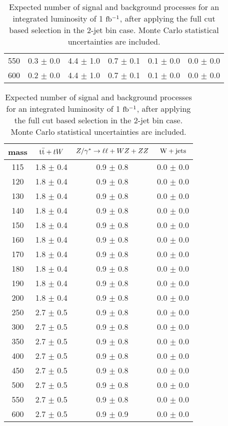 \begin{table}[!ht]
\begin{center}
{\begin{tabular} {|c|c|c|c|c|c|}
550 & 0.3 $\pm$        0.0 &  4.4    $\pm$    1.0 &  0.7 $\pm$   0.1 & 0.1 $\pm$   0.0 &  0.0 $\pm$   0.0 \\
600 & 0.2 $\pm$        0.0 &  4.4    $\pm$    1.0 &  0.7 $\pm$   0.1 & 0.1 $\pm$   0.0 &  0.0 $\pm$   0.0 \\
 \hline
  \end{tabular}
  }
 {\normalsize
  \begin{tabular} {|c|c|c|c|}
\hline
  mass    & $\mathrm{t}\bar{\mathrm{t}}+tW$ & $Z/\gamma^*\to\ell\ell+WZ+ZZ$ & $\mathrm{W+jets}$ \\
  \hline
  \hline
115 &   1.8 $\pm$   0.4 &   0.9 $\pm$   0.8 &  0.0 $\pm$   0.0 \\
120 &   1.8 $\pm$   0.4 &   0.9 $\pm$   0.8 &  0.0 $\pm$   0.0 \\
130 &   1.8 $\pm$   0.4 &   0.9 $\pm$   0.8 &  0.0 $\pm$   0.0 \\
140 &   1.8 $\pm$   0.4 &   0.9 $\pm$   0.8 &  0.0 $\pm$   0.0 \\
150 &   1.8 $\pm$   0.4 &   0.9 $\pm$   0.8 &  0.0 $\pm$   0.0 \\
160 &   1.8 $\pm$   0.4 &   0.9 $\pm$   0.8 &  0.0 $\pm$   0.0 \\
170 &   1.8 $\pm$   0.4 &   0.9 $\pm$   0.8 &  0.0 $\pm$   0.0 \\
180 &   1.8 $\pm$   0.4 &   0.9 $\pm$   0.8 &  0.0 $\pm$   0.0 \\
190 &   1.8 $\pm$   0.4 &   0.9 $\pm$   0.8 &  0.0 $\pm$   0.0 \\
200 &   1.8 $\pm$   0.4 &   0.9 $\pm$   0.8 &  0.0 $\pm$   0.0 \\
250 &   2.7 $\pm$   0.5 &   0.9 $\pm$   0.8 &  0.0 $\pm$   0.0 \\
300 &   2.7 $\pm$   0.5 &   0.9 $\pm$   0.8 &  0.0 $\pm$   0.0 \\
350 &   2.7 $\pm$   0.5 &   0.9 $\pm$   0.8 &  0.0 $\pm$   0.0 \\
400 &	2.7 $\pm$   0.5 &   0.9 $\pm$   0.8 &  0.0 $\pm$   0.0 \\
450 &	2.7 $\pm$   0.5 &   0.9 $\pm$   0.8 &  0.0 $\pm$   0.0 \\
500 &	2.7 $\pm$   0.5 &   0.9 $\pm$   0.8 &  0.0 $\pm$   0.0 \\
550 &	2.7 $\pm$   0.5 &   0.9 $\pm$   0.8 &  0.0 $\pm$   0.0 \\
600 &	2.7 $\pm$   0.5 &   0.9 $\pm$   0.9 &  0.0 $\pm$   0.0 \\
 \hline
  \end{tabular}
  }
  \caption{Expected number of signal and background processes for an 
  integrated luminosity of 1 $\mathrm{fb^{-1}}$, after applying the full cut based 
  selection in the 2-jet bin case. Monte Carlo statistical uncertainties are included.}
   \label{tab:hwwselection2j}
  \end{center}
\end{table}
